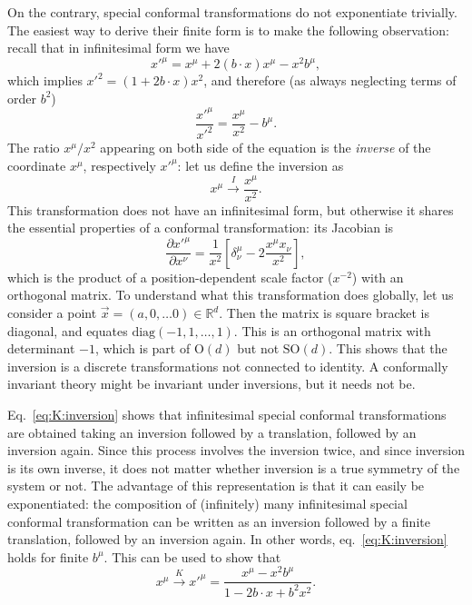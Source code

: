 \documentclass[a4paper,12pt]{article}
\newcommand{\SO}{\text{SO}}
\numberwithin{equation}{section}
\begin{document}
On the contrary, special conformal transformations do not exponentiate trivially. The easiest way to derive their finite form is to make the following observation: recall that in infinitesimal form we have
\begin{equation}
	x'^\mu = x^\mu + 2 (b \cdot x) x^\mu - x^2 b^\mu,
\end{equation}
which implies $x'^2 = \left( 1 + 2 b \cdot x \right) x^2$, and therefore (as always neglecting terms of order $b^2$)
\begin{equation}
	\frac{x'^\mu}{x'^2}
	= \frac{x^\mu}{x^2} - b^\mu.
	\label{eq:K:inversion}
\end{equation}
The ratio $x^\mu/x^2$ appearing on both side of the equation is the \emph{inverse} of the coordinate $x^\mu$, respectively $x'^\mu$: let us define the inversion as
\begin{equation}
	x^\mu \xrightarrow{I} \frac{x^\mu}{x^2}.
\end{equation}
This transformation does not have an infinitesimal form, but otherwise it shares the essential properties of a conformal transformation: its Jacobian is
\begin{equation}
	\frac{\partial x'^\mu}{\partial x^\nu}
	= \frac{1}{x^2}
	\left[ \delta^\mu_\nu - 2 \frac{x^\mu x_\nu}{x^2} \right],
\end{equation}
which is the product of a position-dependent scale factor ($x^{-2}$) with an orthogonal matrix. To understand what this transformation does globally, let us consider a point $\vec{x} = (a, 0, \ldots 0) \in \mathbb{R}^d$. Then the matrix is square bracket is diagonal, and equates $\text{diag}(-1, 1, \ldots, 1)$. This is an orthogonal matrix with determinant $-1$, which is part of $\text{O}(d)$ but not $\SO(d)$. This shows that the inversion is a discrete transformations not connected to identity.
A conformally invariant theory might be invariant under inversions, but it needs not be.

Eq.~\eqref{eq:K:inversion} shows that infinitesimal special conformal transformations are obtained taking an inversion followed by a translation, followed by an inversion again. Since this process involves the inversion twice, and since inversion is its own inverse, it does not matter whether inversion is a true symmetry of the system or not.
The advantage of this representation is that it can easily be exponentiated: the composition of (infinitely) many infinitesimal special conformal transformation can be written as an inversion followed by a finite translation, followed by an inversion again. In other words, eq.~\eqref{eq:K:inversion} holds for finite $b^\mu$.
This can be used to show that
\begin{equation}
	x^\mu \xrightarrow{K}
	x'^\mu = \frac{x^\mu - x^2 b^\mu}
	{1 - 2 b \cdot x + b^2 x^2}.
	\label{eq:K:finite}
\end{equation}
\end{document}
